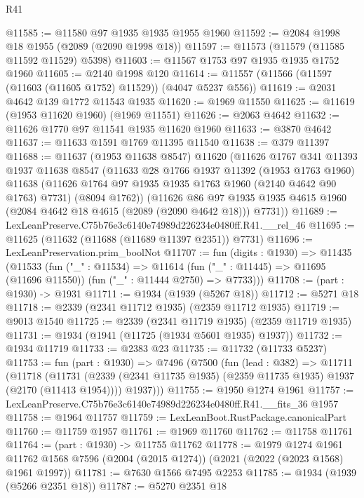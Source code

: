 \begin{lexlean}{R41}
\begin{coremodule}
@11585 := @11580 @97 @1935 @1935 @1955 @1960
@11592 := @2084 @1998 @18 @1955 (@2089 (@2090 @1998 @18))
@11597 := @11573 (@11579 (@11585 @11592 @11529) @5398)
@11603 := @11567 @1753 @97 @1935 @1935 @1752 @1960
@11605 := @2140 @1998 @120
@11614 := @11557 (@11566 (@11597 (@11603 (@11605 @1752) @11529)) (@4047 @5237 @556))
@11619 := @2031 @4642 @139 @1772 @11543 @1935
@11620 := @1969 @11550
@11625 := @11619 (@1953 @11620 @1960) (@1969 @11551)
@11626 := @2063 @4642
@11632 := @11626 @1770 @97 @11541 @1935 @11620 @1960
@11633 := @3870 @4642
@11637 := @11633 @1591 @1769 @11395 @11540
@11638 := @379 @11397
@11688 := @11637
    (@1953 @11638 @8547)
    @11620
    (@11626
      @1767
      @341
      @11393
      @1937
      @11638
      @8547
      (@11633
        @28
        @1766
        @1937
        @11392
        (@1953 @1763 @1960)
        @11638
        (@11626 @1764 @97 @1935 @1935 @1763 @1960 (@2140 @4642 @90 @1763) @7731)
        (@8094 @1762))
      (@11626
        @86
        @97
        @1935
        @1935
        @4615
        @1960
        (@2084 @4642 @18 @4615 (@2089 (@2090 @4642 @18)))
        @7731))
@11689 := LexLeanPreserve.C75b76e3c6140e74989d226234e0480ff.R41.__rel_46
@11695 := @11625 (@11632 (@11688 (@11689 @11397 @2351)) @7731)
@11696 := LexLeanPreservation.prim_boolNot
@11707 := fun (digits : @1930) =>
  @11435
    (@11533
      (fun ("_" : @11534) =>
      @11614 (fun ("_" : @11445) => @11695 (@11696 @11550)) (fun ("_" : @11444 @2750) => @7733)))
@11708 := (part : @1930) -> @1931
@11711 := @1934 (@1939 (@5267 @18))
@11712 := @5271 @18
@11718 := @2339 (@2341 @11712 @1935) (@2359 @11712 @1935)
@11719 := @9013 @1540
@11725 := @2339 (@2341 @11719 @1935) (@2359 @11719 @1935)
@11731 := @1934 (@1941 (@11725 (@1934 @5601 @1935) @1937))
@11732 := @1934 @11719
@11733 := @2383 @23
@11735 := @11732 (@11733 @5237)
@11753 := fun (part : @1930) =>
  @7496
    (@7500
      (fun (lead : @382) =>
      @11711
        (@11718
          (@11731 (@2339 (@2341 @11735 @1935) (@2359 @11735 @1935) @1937 (@2170 (@11413 @1954))))
          @1937)))
@11755 := @1950 @1274 @1961
@11757 := LexLeanPreserve.C75b76e3c6140e74989d226234e0480ff.R41.__fits_36 @1957
@11758 := @1964 @11757
@11759 := LexLeanBoot.RustPackage.canonicalPart
@11760 := @11759 @1957
@11761 := @1969 @11760
@11762 := @11758 @11761
@11764 := (part : @1930) -> @11755 @11762
@11778 := @1979
    @1274
    @1961
    @11762
    @1568
    @7596
    (@2004 (@2015 @1274))
    (@2021 (@2022 (@2023 @1568) @1961 @1997))
@11781 := @7630 @1566 @7495 @2253
@11785 := @1934 (@1939 (@5266 @2351 @18))
@11787 := @5270 @2351 @18

\end{coremodule}
\end{lexlean}
